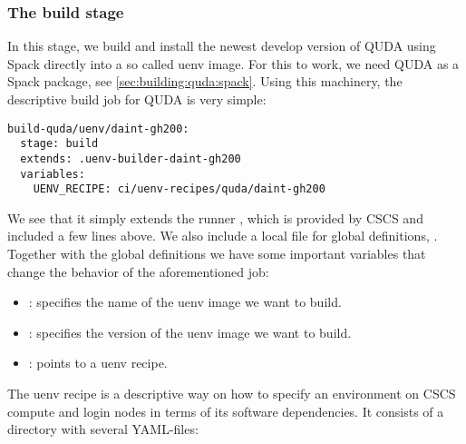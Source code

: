 \subsubsection{The build stage}

In this stage, we build and install the newest develop version of QUDA using Spack\cite{Gamblin_The_Spack_Package_2015} directly into a so called uenv\cite{online:cscs:uenv} image. For this to work, we need QUDA as a Spack package, see \cref{sec:building:quda:spack}. Using this machinery, the descriptive build job for QUDA is very simple:
\begin{verbatim}
build-quda/uenv/daint-gh200:
  stage: build
  extends: .uenv-builder-daint-gh200
  variables:
    UENV_RECIPE: ci/uenv-recipes/quda/daint-gh200
\end{verbatim}
We see that it simply extends the runner , which is provided by CSCS and included a few lines above. We also include a local file for global definitions, . Together with the global definitions we have some important variables that change the behavior of the aforementioned job:
\begin{itemize}
  \item {}: specifies the name of the uenv image we want to build.
  \item {}: specifies the version of the uenv image we want to build.
  \item {}: points to a uenv recipe.
\end{itemize}
The uenv recipe is a descriptive way on how to specify an environment on CSCS compute and login nodes in terms of its software dependencies. It consists of a directory with several YAML-files:
